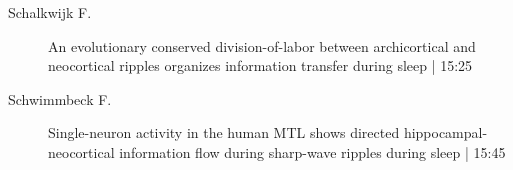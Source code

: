 \begin{symposium}
\begin{description}
                \item [ Schalkwijk F.] An evolutionary conserved division-of-labor between archicortical and neocortical ripples organizes information transfer during sleep \textcolor{mygray}{ | 15:25}    
                
                \item [ Schwimmbeck F.] Single-neuron activity in the human MTL shows directed hippocampal-neocortical information flow during sharp-wave ripples during sleep \textcolor{mygray}{ | 15:45}    
                
            \end{description} 
            \end{symposium}
            